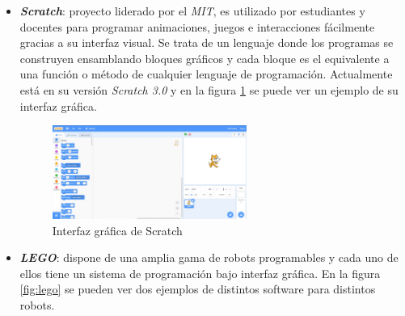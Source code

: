 \begin{itemize}
    \item \textit{\textbf{Scratch}}\cite{bib:scratch}: proyecto liderado por el \textit{MIT}, es utilizado por estudiantes y docentes para programar animaciones, juegos e interacciones fácilmente gracias a su interfaz visual. Se trata de un lenguaje donde los programas se construyen ensamblando bloques gráficos y cada bloque es el equivalente a una función o método de cualquier lenguaje de programación. Actualmente está en su versión \textit{Scratch 3.0} y en la figura \ref{fig:scratch} se puede ver un ejemplo de su interfaz gráfica. 
    \begin{figure}[H]
    \centering
    \includegraphics[width=0.6\textwidth]{img/scratch.jpg}
    \caption{Interfaz gráfica de Scratch} \label{fig:scratch}
    \end{figure}

    \item \textit{\textbf{LEGO}}\cite{bib:lego}: dispone de una amplia gama de robots programables y cada uno de ellos tiene un sistema de programación bajo interfaz gráfica. En la figura \ref{fig:lego} se pueden ver dos ejemplos de distintos software para distintos robots.  
    

\end{itemize}
